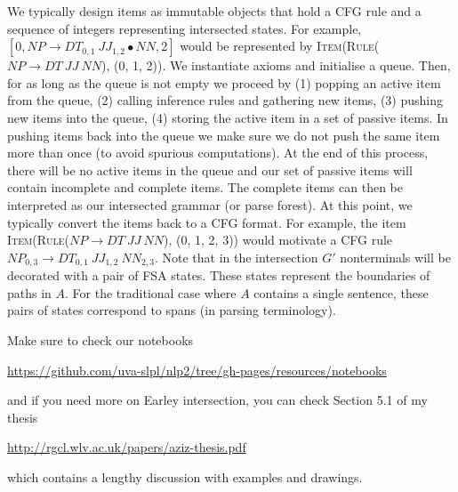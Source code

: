 \documentclass[11pt]{article}
\newcommand{\itembrack}[1]{\ensuremath{\left[ #1 \right]}}
\begin{document}
We typically design items as immutable objects that hold a CFG rule and a sequence of integers representing intersected states.
For example, $\itembrack{0, NP \rightarrow DT_{0,1} ~ JJ_{1,2} \bullet NN, 2}$ would be represented by \textsc{Item}(\textsc{Rule}($NP \rightarrow DT ~ JJ ~ NN$), (0, 1, 2)).
We instantiate axioms and initialise a queue. Then, for as long as the queue is not empty we proceed by (1) popping an active item from the queue, (2) calling inference rules and gathering new items, (3) pushing new items into the queue, (4) storing the active item in a set of passive items.
In pushing items back into the queue we make sure we do not push the same item more than once (to avoid spurious computations).
At the end of this process, there will be no active items in the queue and our set of passive items will contain incomplete and complete items.
The complete items can then be interpreted as our intersected grammar (or parse forest).
At this point, we typically convert the items back to a CFG format. For example, the item \textsc{Item}(\textsc{Rule}($NP \rightarrow DT ~ JJ ~ NN$), (0, 1, 2, 3)) would motivate a CFG rule $NP_{0,3} \rightarrow DT_{0,1} ~ JJ_{1,2} ~ NN_{2,3}$. Note that in the intersection $G'$ nonterminals will be decorated with a pair of FSA states. These states represent the boundaries of paths in $A$. For the traditional case where $A$ contains a single sentence, these pairs of states correspond to spans (in parsing terminology). 


Make sure to check our notebooks
\begin{center}\url{https://github.com/uva-slpl/nlp2/tree/gh-pages/resources/notebooks}\end{center}
and if you need more on Earley intersection, you can check Section 5.1 of my thesis
\begin{center}\url{http://rgcl.wlv.ac.uk/papers/aziz-thesis.pdf}\end{center}
which contains a lengthy discussion with examples and drawings.




\end{document}
